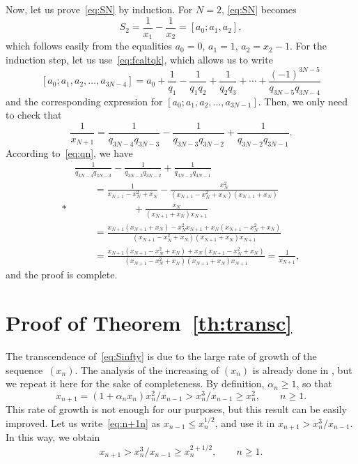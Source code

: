 \documentclass[11pt, a4paper]{amsart}
\theoremstyle{plain}
\theoremstyle{remark}
\begin{document}
Now, let us prove~\eqref{eq:SN} by induction. 
For $N=2$, \eqref{eq:SN} becomes
\[
  S_2 = \frac{1}{x_1} - \frac{1}{x_2} 
  = [a_0;a_1,a_2],
\]
which follows easily from the equalities $a_0=0$, $a_1=1$, $a_2=x_2-1$.
For the induction step, let us use~\eqref{eq:fcaltqk}, which allows us
to write
\[
  [a_0;a_1,a_2,\dots,a_{3N-4}]
  = a_0 + \frac{1}{q_1} - \frac{1}{q_1q_2} + \frac{1}{q_2q_3}
  + \cdots + \frac{(-1)^{3N-5}}{q_{3N-5}q_{3N-4}}
\]
and the corresponding expression for $[a_0;a_1,a_2,\dots,a_{3N-1}]$.
Then, we only need to check that
\[
  \frac{1}{x_{N+1}} = \frac{1}{q_{3N-4}q_{3N-3}}
  - \frac{1}{q_{3N-3}q_{3N-2}} 
  + \frac{1}{q_{3N-2}q_{3N-1}}.
\]
According to~\eqref{eq:qn}, we have
\begin{align*}
  & \frac{1}{q_{3N-4}q_{3N-3}}
  - \frac{1}{q_{3N-3}q_{3N-2}} 
  + \frac{1}{q_{3N-2}q_{3N-1}} \\
  &\qquad = 
  \frac{1}{x_{N+1}-x_N^2+x_N}
  - \frac{x_N^2}{(x_{N+1}-x_N^2+x_N)(x_{N+1}+x_N)} \\*
  &\qquad\qquad\qquad+ \frac{x_N}{(x_{N+1}+x_N)x_{N+1}} \\
  &\qquad =
  \frac{x_{N+1} (x_{N+1}+x_N) - x_N^2x_{N+1} + x_N (x_{N+1}-x_N^2+x_N)}
    {(x_{N+1}-x_N^2+x_N)(x_{N+1}+x_N)x_{N+1}} \\
  &\qquad =
  \frac{x_{N+1} (x_{N+1}-x_N^2+x_N) + x_N (x_{N+1}-x_N^2+x_N)}
    {(x_{N+1}-x_N^2+x_N)(x_{N+1}+x_N)x_{N+1}} 
  = \frac{1}{x_{N+1}},
\end{align*}
and the proof is complete.

\section{Proof of Theorem~\ref{th:transc}}
\label{sec:transc}

The transcendence of~\eqref{eq:Sinfty} is due to the large rate of growth of the sequence~$(x_n)$. The analysis of the increasing of $(x_n)$ is already done in \cite{Hone1, Hone2}, but we repeat it here for the sake of completeness. By definition, $\alpha_n \ge 1$, so that
\begin{equation}
\label{eq:n+1n}
  x_{n+1} = (1+\alpha_nx_n)x_n^2/x_{n-1} > x_n^3/x_{n-1} \ge x_n^2,
  \qquad n \ge 1.
\end{equation}
This rate of growth is not enough for our purposes, but this result can be easily improved. Let us write~\eqref{eq:n+1n} as $x_{n-1} \le x_n^{1/2}$, and use it in $x_{n+1} > x_n^3/x_{n-1}$. 
In this way, we obtain
\begin{equation}
\label{eq:2+1/2}
  x_{n+1} > x_n^3/x_{n-1} \ge x_n^{2+1/2}, 
  \qquad n \ge 1.
\end{equation}
\end{document}
